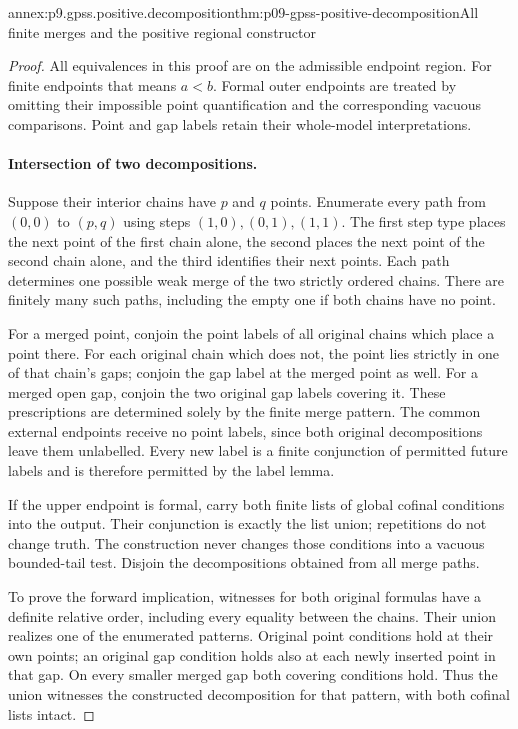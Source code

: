 \begin{annexitem}{annex:p9.gpss.positive.decomposition}{thm:p09-gpss-positive-decomposition}{All finite merges and the positive regional constructor}
\begin{proof}
All equivalences in this proof are on the admissible
endpoint region. For finite endpoints that means
\(a<b\). Formal outer endpoints are treated by
omitting their impossible point quantification and
the corresponding vacuous comparisons. Point and
gap labels retain their whole-model interpretations.

\paragraph{Intersection of two decompositions.}
Suppose their interior chains have \(p\) and
\(q\) points. Enumerate every path from
\((0,0)\) to \((p,q)\) using steps
\((1,0),(0,1),(1,1)\). The first step type
places the next point of the first chain alone,
the second places the next point of the second
chain alone, and the third identifies their
next points. Each path determines one possible
weak merge of the two strictly ordered chains.
There are finitely many such paths, including
the empty one if both chains have no point.

For a merged point, conjoin the point labels
of all original chains which place a point
there. For each original chain which does
not, the point lies strictly in one of that
chain's gaps; conjoin the gap label at the
merged point as well. For a merged open
gap, conjoin the two original gap labels
covering it. These prescriptions are determined
solely by the finite merge pattern. The common
external endpoints receive no point labels,
since both original decompositions leave
them unlabelled. Every new label is a finite
conjunction of permitted future labels and
is therefore permitted by the label lemma.

If the upper endpoint is formal, carry both
finite lists of global cofinal conditions
into the output. Their conjunction is exactly
the list union; repetitions do not change
truth. The construction never changes those
conditions into a vacuous bounded-tail test.
Disjoin the decompositions obtained from
all merge paths.

To prove the forward implication, witnesses
for both original formulas have a definite
relative order, including every equality
between the chains. Their union realizes
one of the enumerated patterns. Original
point conditions hold at their own points;
an original gap condition holds also at
each newly inserted point in that gap.
On every smaller merged gap both covering
conditions hold. Thus the union witnesses
the constructed decomposition for that
pattern, with both cofinal lists intact.


\end{proof}
\end{annexitem}

